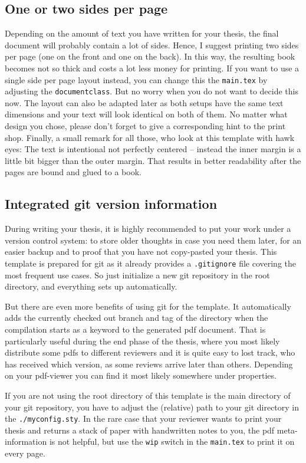 \documentclass[../main.tex]{subfiles}
\begin{document}
\subsection{One or two sides per page}
Depending on the amount of text you have written for your thesis, the final document will probably contain a lot of sides.
Hence, I suggest printing two sides per page (one on the front and one on the back).
In this way, the resulting book becomes not so thick and costs a lot less money for printing.
If you want to use a single side per page layout instead, you can change this the \texttt{main.tex} by adjusting the \texttt{documentclass}.
But no worry when you do not want to decide this now.
The layout can also be adapted later as both setups have the same text dimensions and your text will look identical on both of them.
No matter what design you chose, please don't forget to give a corresponding hint to the print shop.
Finally, a small remark for all those, who look at this template with hawk eyes:
The text is intentional not perfectly centered -- instead the inner margin is a little bit bigger than the outer margin.
That results in better readability after the pages are bound and glued to a book.

\subsection{Integrated git version information}
During writing your thesis, it is highly recommended to put your work under a version control system: to store older thoughts in case you need them later, for an easier backup and to proof that you have not copy-pasted your thesis.
This template is prepared for git as it already provides a \texttt{.gitignore} file covering the most frequent use cases.
So just initialize a new git repository in the root directory, and everything sets up automatically.

But there are even more benefits of using git for the template.
It automatically adds the currently checked out branch and tag of the directory when the compilation starts as a keyword to the generated pdf document.
That is particularly useful during the end phase of the thesis, where you most likely distribute some pdfs to different reviewers and it is quite easy to lost track, who has received which version, as some reviews arrive later than others.
Depending on your pdf-viewer you can find it most likely somewhere under properties.

If you are not using the root directory of this template is the main directory of your git repository, you have to adjust the (relative) path to your git directory in the \texttt{./myconfig.sty}.
In the rare case that your reviewer wants to print your thesis and returns a stack of paper with handwritten notes to you, the pdf meta-information is not helpful, but use the \texttt{wip} switch in the \texttt{main.tex} to print it on every page.
\end{document}
